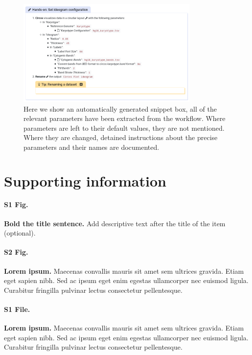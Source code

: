 \documentclass[10pt,letterpaper]{article}
\begin{document}
\begin{figure}[!ht]
	\centering
	\includegraphics[width=0.8\textwidth]{images/tool-in-tutorial.png}
	\caption{Here we show an automatically generated snippet box, all of the relevant parameters have been extracted from the workflow. Where parameters are left to their default values, they are not mentioned. Where they are changed, detained instructions about the precise parameters and their names are documented.\label{fig:planemo}}
\end{figure}

\section*{Supporting information}

\paragraph*{S1 Fig.}
\label{S1_Fig}
{\bf Bold the title sentence.} Add descriptive text after the title of the item (optional).

\paragraph*{S2 Fig.}
\label{S2_Fig}
{\bf Lorem ipsum.} Maecenas convallis mauris sit amet sem ultrices gravida. Etiam eget sapien nibh. Sed ac ipsum eget enim egestas ullamcorper nec euismod ligula. Curabitur fringilla pulvinar lectus consectetur pellentesque.

\paragraph*{S1 File.}
\label{S1_File}
{\bf Lorem ipsum.}  Maecenas convallis mauris sit amet sem ultrices gravida. Etiam eget sapien nibh. Sed ac ipsum eget enim egestas ullamcorper nec euismod ligula. Curabitur fringilla pulvinar lectus consectetur pellentesque.
\end{document}
